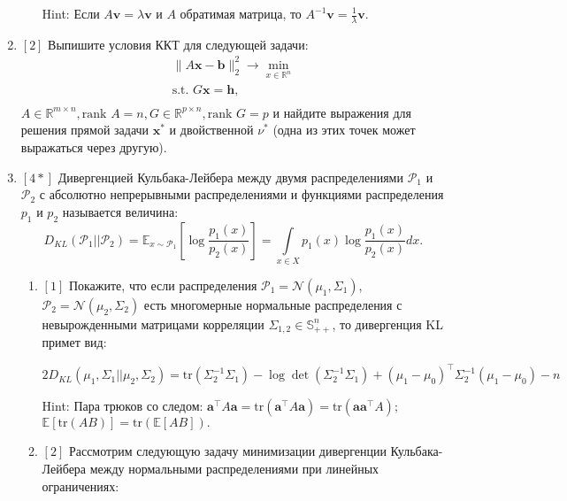 \documentclass{article}
\begin{document}
\begin{enumerate}
\begin{enumerate}[label=\alph*)]
        Hint: Если $A \mathbf{v}=\lambda \mathbf{v}$ и $A$ обратимая матрица, то $A^{-1}\mathbf{v} = \frac{1}{\lambda} \mathbf{v}$.

    \end{enumerate}     
        

    \item $[2]$ Выпишите условия ККТ для следующей задачи:
    \begin{gather*}
        \|A\textbf{x}-\textbf{b}\|_2^2\rightarrow \min_{x\in\mathbb{R}^n}\\
        \text{s.t. } G\textbf{x}= \textbf{h},\\
    \end{gather*}
    $A\in\mathbb{R}^{m \times n},\text{rank } A = n, G \in \mathbb{R}^{p \times n},\text{rank } G = p $ и найдите выражения для решения прямой задачи $\textbf{x}^*$ и двойственной $\nu^*$ (одна из этих точек может выражаться через другую).

    \item $[4*]$ Дивергенцией Кульбака-Лейбера между двумя распределениями $\mathcal{P}_1$ и $\mathcal{P}_2$ с абсолютно непрерывными распределениями и функциями распределения $p_1$ и $p_2$ называется величина:
    \begin{equation*}
        D_{KL}(\mathcal{P}_1||\mathcal{P}_2)=\mathbb{E}_{x\sim\mathcal{P}_1}\left[\log\frac{p_1(x)}{p_2(x)}\right]=\int\limits_{x\in X}p_1(x)\log\frac{p_1(x)}{p_2(x)}dx.
    \end{equation*}
    
    \begin{enumerate}[label=\alph*)]
     \item $[1]$ Покажите, что если распределения $\mathcal{P}_1=\mathcal{N}(\mu_1, \Sigma_1)$, $\mathcal{P}_2=\mathcal{N}(\mu_2, \Sigma_2)$ есть многомерные нормальные распределения с невырожденными матрицами корреляции $\Sigma_{1,2}\in\mathbb{S}^n_{++}$, то дивергенция KL примет вид:
     
     $$2D_{KL}(\mu_1, \Sigma_1||\mu_2,\Sigma_2)=\text{tr}\left(\Sigma^{-1}_2\Sigma_1\right)-\log\det \left(\Sigma^{-1}_2\Sigma_1\right) + (\mu_1-\mu_0)^\top\Sigma^{-1}_2 (\mu_1-\mu_0) - n$$
     
     Hint: Пара трюков со следом: $\mathbf{a}^\top A\mathbf{a}=\text{tr}(\mathbf{a}^\top A\mathbf{a})=\text{tr}(\mathbf{a}\mathbf{a}^\top A);$ $\mathbb{E}[\text{tr}(AB)]=\text{tr}\left(\mathbb{E}[AB]\right).$
     \item $[2]$ Рассмотрим следующую задачу минимизации дивергенции Кульбака-Лейбера между нормальными распределениями при линейных ограничениях:
     

\end{enumerate}
\end{enumerate}
\end{document}
